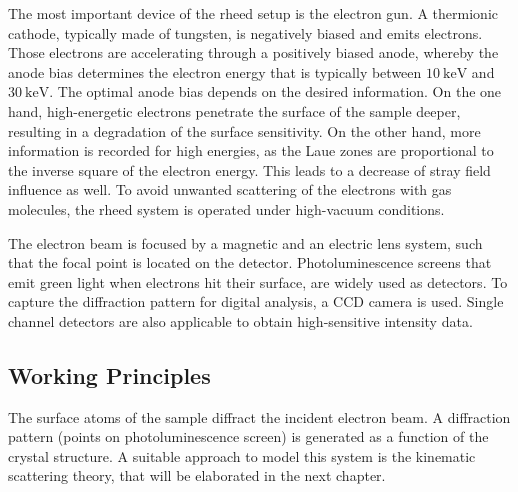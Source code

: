 The most important device of the \ac{rheed} setup is the electron gun.
A thermionic cathode, typically made of tungsten, is negatively biased and emits 
electrons.
Those electrons are accelerating through a positively biased anode, whereby the anode
bias determines the electron energy that is typically between 
$\qty{10}{\kilo\electronvolt}$ and $\qty{30}{\kilo \electronvolt}$.
The optimal anode bias depends on the desired information.
On the one hand, high-energetic electrons penetrate the surface of the sample deeper, 
resulting in a degradation of the surface sensitivity.
On the other hand, more information is recorded for high energies, as the Laue
zones are proportional to the inverse square of the electron energy. 
This leads to a decrease of stray field influence as well. 
To avoid unwanted scattering of the electrons with gas molecules, the \ac{rheed} system 
is operated under high-vacuum conditions.

The electron beam is focused by a magnetic and an electric lens system, such that
the focal point is located on the detector.
Photoluminescence screens that emit green light when 
electrons hit their surface, are widely used as detectors.
To capture the diffraction pattern for digital analysis, a CCD camera is used. 
Single channel detectors are also applicable to obtain high-sensitive intensity data.

\subsection{Working Principles}
The surface atoms of the sample diffract the incident electron beam.
A diffraction pattern (points on photoluminescence screen) 
is generated as a function of the crystal structure.
A suitable approach to model this system is the kinematic scattering theory, 
that will be elaborated in the next chapter. 

